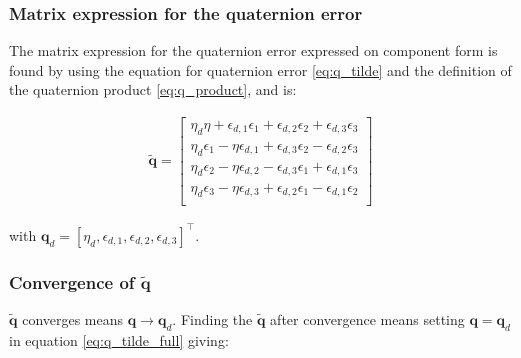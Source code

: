 \subsubsection*{ Matrix expression for the quaternion error}

The matrix expression for the quaternion error expressed on component form is found by using the equation for quaternion error  \eqref{eq:q_tilde} and the definition of the quaternion product \eqref{eq:q_product}, and is:



\begin{equation}
    \begin{aligned}
    \tilde{\boldsymbol{q}}
    =
    \begin{bmatrix}
    \eta_d \eta + \epsilon_{d,1} \epsilon_1 + \epsilon_{d,2} \epsilon_2 + \epsilon_{d,3} \epsilon_3 \\
    \eta_d \epsilon_1 - \eta \epsilon_{d,1} + \epsilon_{d,3} \epsilon_{2} - \epsilon_{d,2} \epsilon_{3} \\
    \eta_d \epsilon_2 - \eta \epsilon_{d,2} - \epsilon_{d,3} \epsilon_{1} + \epsilon_{d,1} \epsilon_{3} \\
    \eta_d \epsilon_3 - \eta \epsilon_{d,3} + \epsilon_{d,2} \epsilon_{1} - \epsilon_{d,1} \epsilon_{2} \\
    \end{bmatrix}
    \label{eq:q_tilde_full}
    \end{aligned}
\end{equation}

with $\mathbf{q}_d = [\eta_d, \epsilon_{d,1}, \epsilon_{d,2}, \epsilon_{d,3}]^\top$.

\subsubsection*{ Convergence of $\tilde{\mathbf{q}}$}

$\tilde{\mathbf{q}}$ converges means $\mathbf{q} \rightarrow \mathbf{q}_d$. Finding the $\tilde{\mathbf{q}}$ after convergence means setting $\mathbf{q} = \mathbf{q}_d$  in equation \eqref{eq:q_tilde_full} giving:


